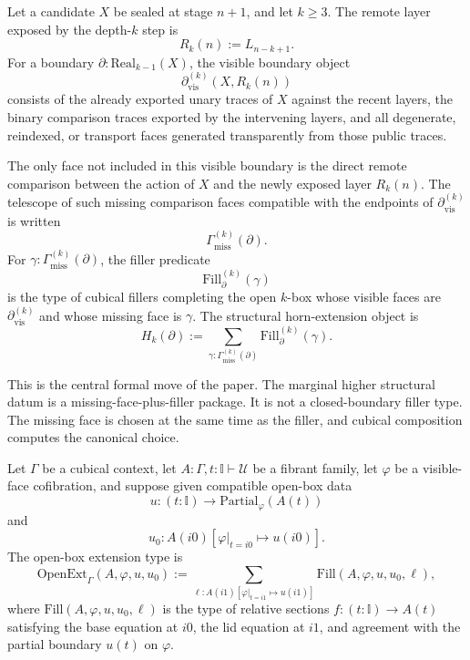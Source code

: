 \documentclass{lmcs}
\begin{document}
\begin{defi}
\label{def:structural-horn-package}
Let a candidate \(X\) be sealed at stage \(n+1\), and let \(k\geq 3\).  The remote layer
exposed by the depth-\(k\) step is
\[
  R_k(n) := L_{n-k+1}.
\]
For a boundary \(\partial : \mathrm{Real}_{k-1}(X)\), the visible boundary object
\[
  \partial_{\mathrm{vis}}^{(k)}(X,R_k(n))
\]
consists of the already exported unary traces of \(X\) against the recent layers, the binary
comparison traces exported by the intervening layers, and all degenerate, reindexed, or
transport faces generated transparently from those public traces.

The only face not included in this visible boundary is the direct remote comparison between
the action of \(X\) and the newly exposed layer \(R_k(n)\).  The telescope of such missing
comparison faces compatible with the endpoints of \(\partial_{\mathrm{vis}}^{(k)}\) is written
\[
  \Gamma_{\mathrm{miss}}^{(k)}(\partial).
\]
For \(\gamma:\Gamma_{\mathrm{miss}}^{(k)}(\partial)\), the filler predicate
\[
  \mathrm{Fill}^{(k)}_{\partial}(\gamma)
\]
is the type of cubical fillers completing the open \(k\)-box whose visible faces are
\(\partial_{\mathrm{vis}}^{(k)}\) and whose missing face is \(\gamma\).  The structural
horn-extension object is
\[
  H_k(\partial)
  :=
  \sum_{\gamma:\Gamma_{\mathrm{miss}}^{(k)}(\partial)}
  \mathrm{Fill}^{(k)}_{\partial}(\gamma).
\]
\end{defi}

This is the central formal move of the paper.  The marginal higher structural datum is a
missing-face-plus-filler package.  It is not a closed-boundary filler type.  The missing face is
chosen at the same time as the filler, and cubical composition computes the canonical choice.

\begin{defi}
\label{def:open-ext}
Let \(\Gamma\) be a cubical context, let \(A : \Gamma,t:\mathbb I\vdash \mathcal U\) be a
fibrant family, let \(\varphi\) be a visible-face cofibration, and suppose given compatible
open-box data
\[
  u : (t:\mathbb I) \to \mathrm{Partial}_{\varphi}(A(t))
\]
and
\[
  u_0 : A(i0)[\varphi|_{t=i0}\mapsto u(i0)].
\]
The open-box extension type is
\[
  \mathrm{OpenExt}_{\Gamma}(A,\varphi,u,u_0)
  :=
  \sum_{\ell:A(i1)[\varphi|_{t=i1}\mapsto u(i1)]}
  \mathrm{Fill}(A,\varphi,u,u_0,\ell),
\]
where \(\mathrm{Fill}(A,\varphi,u,u_0,\ell)\) is the type of relative sections
\(f:(t:\mathbb I)\to A(t)\) satisfying the base equation at \(i0\), the lid equation at
\(i1\), and agreement with the partial boundary \(u(t)\) on \(\varphi\).
\end{defi}
\end{document}
